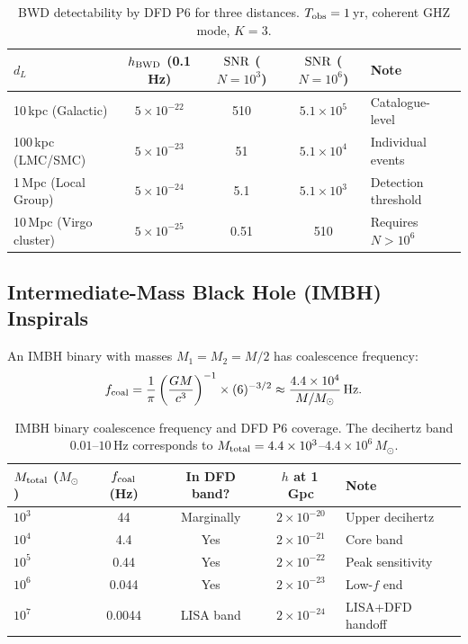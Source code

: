 \documentclass[11pt]{article}
\theoremstyle{definition}
\theoremstyle{remark}
\newcommand{\Msun}{M_\odot}
\newcommand{\ee}[1]{\times10^{#1}}
\begin{document}
\begin{table}[h]
\centering
\caption{BWD detectability by DFD P6 for three distances.
$T_{\rm obs} = 1$\,yr, coherent GHZ mode, $K=3$.}
\label{tab:BWD}
\begin{tabular}{@{}lcccl@{}}
\toprule
$d_L$ & $h_{\rm BWD}$ (0.1 Hz) & $\rm SNR$ ($N=10^3$) & $\rm SNR$ ($N=10^6$) & Note \\
\midrule
10\,kpc (Galactic) & $5\ee{-22}$ & 510 & $5.1\ee{5}$ & Catalogue-level \\
100\,kpc (LMC/SMC) & $5\ee{-23}$ & 51 & $5.1\ee{4}$ & Individual events \\
1\,Mpc (Local Group) & $5\ee{-24}$ & 5.1 & $5.1\ee{3}$ & Detection threshold \\
10\,Mpc (Virgo cluster) & $5\ee{-25}$ & 0.51 & 510 & Requires $N>10^6$ \\
\bottomrule
\end{tabular}
\end{table}

\subsection{Intermediate-Mass Black Hole (IMBH) Inspirals}

An IMBH binary with masses $M_1 = M_2 = M/2$ has coalescence frequency:
\begin{equation}
f_{\rm coal} = \frac{1}{\pi} \left(\frac{G M}{c^3}\right)^{-1}
\times (6)^{-3/2} \approx \frac{4.4\ee{4}}{M/\Msun}\,\rm Hz.
\label{eq:coalescence-f}
\end{equation}

\begin{table}[h]
\centering
\caption{IMBH binary coalescence frequency and DFD P6 coverage.
The decihertz band $0.01$--$10$\,Hz corresponds to
$M_{\rm total} = 4.4\ee{3}$--$4.4\ee{6}\,\Msun$.}
\label{tab:IMBH}
\begin{tabular}{@{}lcccl@{}}
\toprule
$M_{\rm total}$ ($\Msun$) & $f_{\rm coal}$ (Hz) & In DFD band? & $h$ at 1\,Gpc & Note \\
\midrule
$10^3$ & 44 & Marginally & $2\ee{-20}$ & Upper decihertz \\
$10^4$ & 4.4 & Yes & $2\ee{-21}$ & Core band \\
$10^5$ & 0.44 & Yes & $2\ee{-22}$ & Peak sensitivity \\
$10^6$ & 0.044 & Yes & $2\ee{-23}$ & Low-$f$ end \\
$10^7$ & 0.0044 & LISA band & $2\ee{-24}$ & LISA+DFD handoff \\
\bottomrule
\end{tabular}
\end{table}
\end{document}
